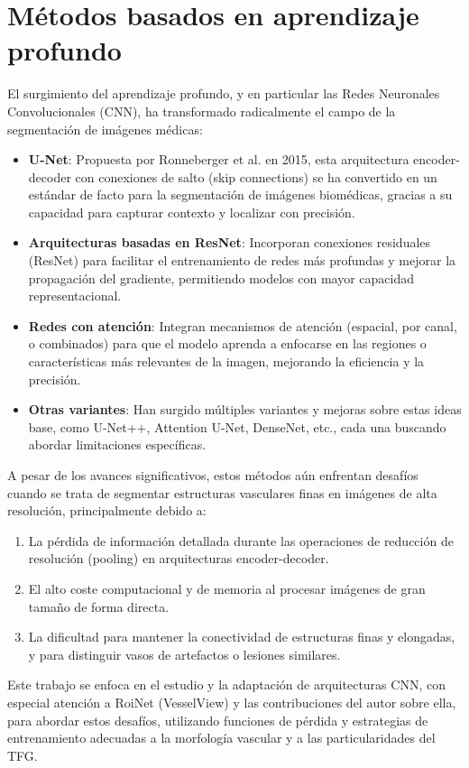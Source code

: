 \documentclass[11pt,a4paper]{report} %
\begin{document}
\section{Métodos basados en aprendizaje profundo}
El surgimiento del aprendizaje profundo, y en particular las Redes Neuronales Convolucionales (CNN), ha transformado radicalmente el campo de la segmentación de imágenes médicas:
\begin{itemize}
  \item \textbf{U-Net}: Propuesta por Ronneberger et al. en 2015, esta arquitectura encoder-decoder con conexiones de salto (skip connections) se ha convertido en un estándar de facto para la segmentación de imágenes biomédicas, gracias a su capacidad para capturar contexto y localizar con precisión.
  \item \textbf{Arquitecturas basadas en ResNet}: Incorporan conexiones residuales (ResNet) para facilitar el entrenamiento de redes más profundas y mejorar la propagación del gradiente, permitiendo modelos con mayor capacidad representacional.
  \item \textbf{Redes con atención}: Integran mecanismos de atención (espacial, por canal, o combinados) para que el modelo aprenda a enfocarse en las regiones o características más relevantes de la imagen, mejorando la eficiencia y la precisión.
  \item \textbf{Otras variantes}: Han surgido múltiples variantes y mejoras sobre estas ideas base, como U-Net++, Attention U-Net, DenseNet, etc., cada una buscando abordar limitaciones específicas.
\end{itemize}
A pesar de los avances significativos, estos métodos aún enfrentan desafíos cuando se trata de segmentar estructuras vasculares finas en imágenes de alta resolución, principalmente debido a:
\begin{enumerate}
  \item La pérdida de información detallada durante las operaciones de reducción de resolución (pooling) en arquitecturas encoder-decoder.
  \item El alto coste computacional y de memoria al procesar imágenes de gran tamaño de forma directa.
  \item La dificultad para mantener la conectividad de estructuras finas y elongadas, y para distinguir vasos de artefactos o lesiones similares.
\end{enumerate}
Este trabajo se enfoca en el estudio y la adaptación de arquitecturas CNN, con especial atención a RoiNet (VesselView) y las contribuciones del autor sobre ella, para abordar estos desafíos, utilizando funciones de pérdida y estrategias de entrenamiento adecuadas a la morfología vascular y a las particularidades del TFG.
\end{document}
